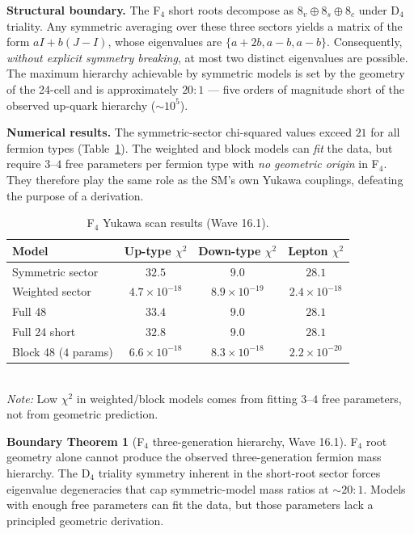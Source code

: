 \documentclass[11pt,a4paper]{article}
\theoremstyle{definition}
\newtheorem{boundary}{Boundary Theorem}
\begin{document}
\textbf{Structural boundary.} The F$_4$ short roots decompose as
$8_v \oplus 8_s \oplus 8_c$ under D$_4$ triality. Any symmetric averaging
over these three sectors yields a matrix of the form $aI + b(J-I)$, whose
eigenvalues are $\{a+2b, a-b, a-b\}$. Consequently, \emph{without explicit
symmetry breaking}, at most two distinct eigenvalues are possible. The
maximum hierarchy achievable by symmetric models is set by the geometry of
the 24-cell and is approximately $20{:}1$ --- five orders of magnitude short
of the observed up-quark hierarchy ($\sim 10^5$).

\textbf{Numerical results.} The symmetric-sector chi-squared values exceed
$21$ for all fermion types (Table~\ref{tab:f4}). The weighted and block
models can \emph{fit} the data, but require $3$--$4$ free parameters per
fermion type with \emph{no geometric origin} in F$_4$. They therefore play
the same role as the SM's own Yukawa couplings, defeating the purpose of a
derivation.

\begin{table}[htb]
\centering
\caption{F$_4$ Yukawa scan results (Wave 16.1).}
\label{tab:f4}
\begin{tabular}{lccc}
\toprule
Model & Up-type $\chi^2$ & Down-type $\chi^2$ & Lepton $\chi^2$ \\
\midrule
Symmetric sector & $32.5$ & $9.0$ & $28.1$ \\
Weighted sector & $4.7 \times 10^{-18}$ & $8.9 \times 10^{-19}$ & $2.4 \times 10^{-18}$ \\
Full 48 & $33.4$ & $9.0$ & $28.1$ \\
Full 24 short & $32.8$ & $9.0$ & $28.1$ \\
Block 48 ($4$ params) & $6.6 \times 10^{-18}$ & $8.3 \times 10^{-18}$ & $2.2 \times 10^{-20}$ \\
\bottomrule
\end{tabular}
\\[0.5em]
\small\textit{Note:} Low $\chi^2$ in weighted/block models comes from
fitting $3$--$4$ free parameters, not from geometric prediction.
\end{table}

\begin{boundary}[F$_4$ three-generation hierarchy, Wave 16.1]\label{boundary:f4}
  F$_4$ root geometry alone cannot produce the observed three-generation
  fermion mass hierarchy. The D$_4$ triality symmetry inherent in the
  short-root sector forces eigenvalue degeneracies that cap symmetric-model
  mass ratios at $\sim 20{:}1$. Models with enough free parameters can fit
  the data, but those parameters lack a principled geometric derivation.
\end{boundary}
\end{document}
